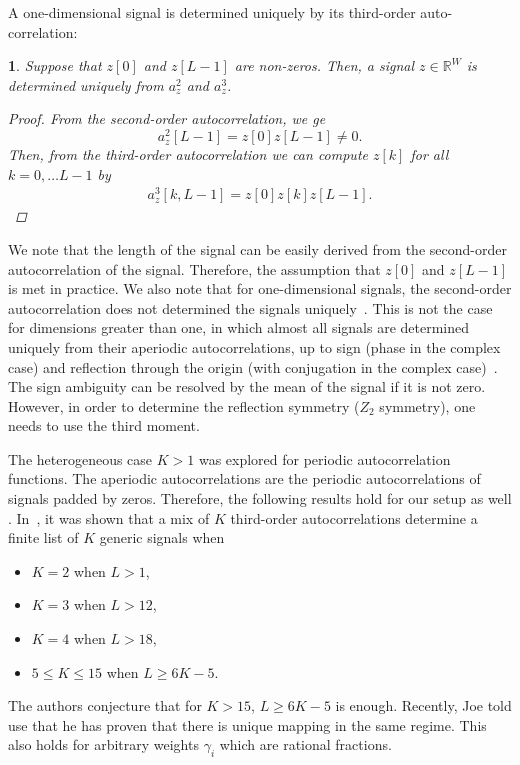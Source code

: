 \documentclass[english,11pt]{article}
\newcommand{\TODO}[1]{{\color{red}{[#1]}}}
\numberwithin{equation}{section}
\theoremstyle{plain}
\theoremstyle{definition}
\theoremstyle{remark}
\theoremstyle{plain}
\theoremstyle{remark}
\theoremstyle{plain}
\theoremstyle{plain}
\newtheorem{proposition}[thm]{\protect\propositionname}
\providecommand{\propositionname}{Proposition}
\begin{document}
A one-dimensional signal is determined uniquely by its third-order auto-correlation:
\begin{proposition}
	Suppose that $z[0]$ and $z[L-1]$ are non-zeros. Then, a signal $z\in\mathbb{R}^W$ is determined uniquely from  $a_z^2$ and $a_z^3$.
	\begin{proof}
		From the second-order autocorrelation, we ge
		\begin{equation*}
		a_z^2[L-1] = z[0]z[L-1]\neq 0.
		\end{equation*}
		Then, from the third-order autocorrelation we can compute $z[k]$ for all $k=0,\ldots L-1$ by
		\begin{eqnarray}
		a_z^3[k,L-1] = z[0]z[k]z[L-1].
		\end{eqnarray}
	\end{proof}
\end{proposition}
We note that the length of the signal can be easily derived from the second-order autocorrelation of the signal. Therefore, the assumption that $z[0]$ and $z[L-1]$ is met in practice. We also note that for one-dimensional signals, the second-order autocorrelation does not determined the signals uniquely~\cite{beinert2015ambiguities,bendory2017fourier}. This is not the case for dimensions greater than one, in which almost all signals are determined uniquely from their aperiodic autocorrelations, up to sign (phase in the complex case) and reflection through the origin (with conjugation in the complex case)~\cite{hayes1982reconstruction,hayes1982reducible,bendory2017fourier}. The sign ambiguity can be resolved by the mean of the signal if it is not zero. However,  in order to determine the reflection symmetry ($Z_2$ symmetry), one needs to use the third moment.

The heterogeneous case $K>1$ was explored for periodic autocorrelation functions. The aperiodic autocorrelations are the periodic autocorrelations of signals padded by zeros. Therefore, the following results hold for our setup as well  \TODO{This part is wrong -- Email correspondence with Alex}. In~\cite{bandeira2017estimation}, it was shown that a mix of $K$ third-order autocorrelations determine  a finite list of $K$ generic signals when 
\begin{itemize}
	\item $K=2$ when $L>1$,
	\item $K=3$ when $L>12$,
	\item $K=4$ when $L>18$,
	\item $5\leq K\leq 15$ when $L\geq 6K-5$.	
\end{itemize}
The authors conjecture that for $K>15$, $L\geq 6K-5$ is enough. Recently, Joe told use that he has proven that there is unique mapping in the same regime.  
This also holds for arbitrary weights $\gamma_i$ which are rational fractions.
\end{document}
